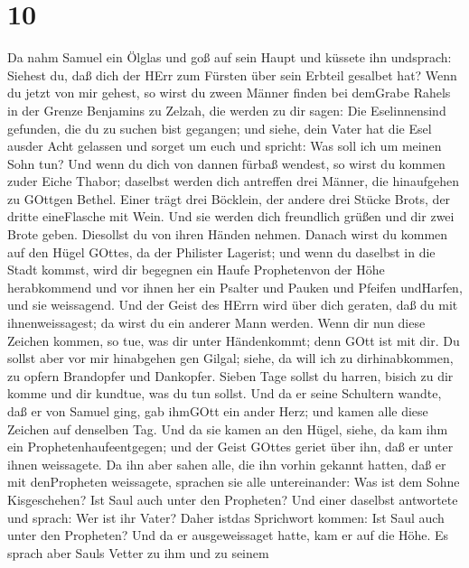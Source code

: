 \hypertarget{section-9}{%
\section{10}\label{section-9}}

 Da nahm Samuel ein Ölglas und goß auf sein Haupt und
küssete ihn undsprach: Siehest du, daß dich der HErr zum Fürsten über
sein Erbteil gesalbet hat?  Wenn du jetzt von mir gehest, so
wirst du zween Männer finden bei demGrabe Rahels in der Grenze Benjamins
zu Zelzah, die werden zu dir sagen: Die Eselinnensind gefunden, die du
zu suchen bist gegangen; und siehe, dein Vater hat die Esel ausder Acht
gelassen und sorget um euch und spricht: Was soll ich um meinen Sohn
tun?  Und wenn du dich von dannen fürbaß wendest, so wirst
du kommen zuder Eiche Thabor; daselbst werden dich antreffen drei
Männer, die hinaufgehen zu GOttgen Bethel. Einer trägt drei Böcklein,
der andere drei Stücke Brots, der dritte eineFlasche mit Wein.
 Und sie werden dich freundlich grüßen und dir zwei Brote
geben. Diesollst du von ihren Händen nehmen.  Danach wirst
du kommen auf den Hügel GOttes, da der Philister Lagerist; und wenn du
daselbst in die Stadt kommst, wird dir begegnen ein Haufe Prophetenvon
der Höhe herabkommend und vor ihnen her ein Psalter und Pauken und
Pfeifen undHarfen, und sie weissagend.  Und der Geist des
HErrn wird über dich geraten, daß du mit ihnenweissagest; da wirst du
ein anderer Mann werden.  Wenn dir nun diese Zeichen kommen,
so tue, was dir unter Händenkommt; denn GOtt ist mit dir. 
Du sollst aber vor mir hinabgehen gen Gilgal; siehe, da will ich zu
dirhinabkommen, zu opfern Brandopfer und Dankopfer. Sieben Tage sollst
du harren, bisich zu dir komme und dir kundtue, was du tun sollst.
 Und da er seine Schultern wandte, daß er von Samuel ging,
gab ihmGOtt ein ander Herz; und kamen alle diese Zeichen auf denselben
Tag.  Und da sie kamen an den Hügel, siehe, da kam ihm ein
Prophetenhaufeentgegen; und der Geist GOttes geriet über ihn, daß er
unter ihnen weissagete.  Da ihn aber sahen alle, die ihn
vorhin gekannt hatten, daß er mit denPropheten weissagete, sprachen sie
alle untereinander: Was ist dem Sohne Kisgeschehen? Ist Saul auch unter
den Propheten?  Und einer daselbst antwortete und sprach:
Wer ist ihr Vater? Daher istdas Sprichwort kommen: Ist Saul auch unter
den Propheten?  Und da er ausgeweissaget hatte, kam er auf
die Höhe.  Es sprach aber Sauls Vetter zu ihm und zu seinem
